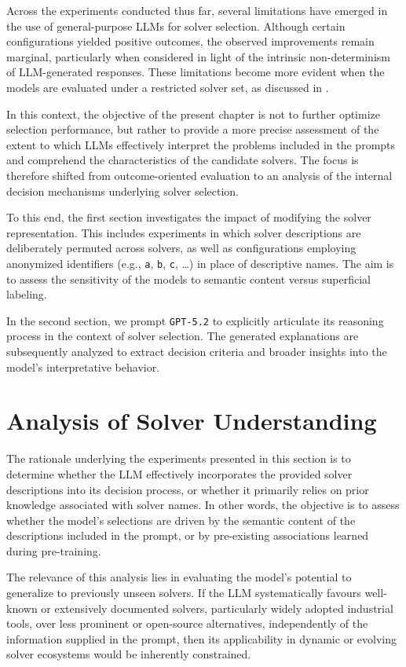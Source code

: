 \documentclass[../../main]{subfiles}
\begin{document}
Across the experiments conducted thus far, several limitations have emerged in the use of general-purpose LLMs for solver selection. Although certain configurations yielded positive outcomes, the observed improvements remain marginal, particularly when considered in light of the intrinsic non-determinism of LLM-generated responses. These limitations become more evident when the models are evaluated under a restricted solver set, as discussed in .

In this context, the objective of the present chapter is not to further optimize selection performance, but rather to provide a more precise assessment of the extent to which LLMs effectively interpret the problems included in the prompts and comprehend the characteristics of the candidate solvers. The focus is therefore shifted from outcome-oriented evaluation to an analysis of the internal decision mechanisms underlying solver selection.

To this end, the first section investigates the impact of modifying the solver representation. This includes experiments in which solver descriptions are deliberately permuted across solvers, as well as configurations employing anonymized identifiers (e.g., \texttt{a}, \texttt{b}, \texttt{c}, \dots) in place of descriptive names. The aim is to assess the sensitivity of the models to semantic content versus superficial labeling.

In the second section, we prompt \texttt{GPT-5.2} to explicitly articulate its reasoning process in the context of solver selection. The generated explanations are subsequently analyzed to extract decision criteria and broader insights into the model's interpretative behavior.

\section{Analysis of Solver Understanding}
The rationale underlying the experiments presented in this section is to determine whether the LLM effectively incorporates the provided solver descriptions into its decision process, or whether it primarily relies on prior knowledge associated with solver names. In other words, the objective is to assess whether the model's selections are driven by the semantic content of the descriptions included in the prompt, or by pre-existing associations learned during pre-training.

The relevance of this analysis lies in evaluating the model's potential to generalize to previously unseen solvers. If the LLM systematically favours well-known or extensively documented solvers, particularly widely adopted industrial tools, over less prominent or open-source alternatives, independently of the information supplied in the prompt, then its applicability in dynamic or evolving solver ecosystems would be inherently constrained.
\end{document}
